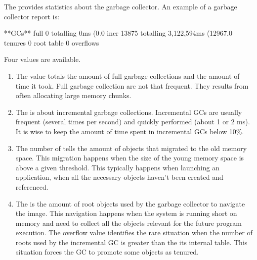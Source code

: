 \documentclass[a4paper,10pt,twoside]{book}
\begin{document}
The  provides statistics about the garbage collector. An example of a garbage collector report is:

\begin{code}

**GCs**
	full			0 totalling 0ms (0.0%
	incr		13875 totalling 3,122,594ms (12967.0%
	tenures		0
	root table	0 overflows
\end{code}

Four values are available.

\begin{enumerate}
\item The  value totals the amount of full garbage collections and the amount of time it took. Full garbage collection are not that frequent. They results from often allocating large memory chunks.

\item The  is about incremental garbage collections. Incremental GCs are usually frequent (several times per second) and quickly performed (about 1 or 2 ms). It is wise to keep the amount of time spent in incremental GCs below 10\%. 


\item The number of  tells the amount of objects that migrated to the old memory space. This migration happens when the size of the young memory space is above a given threshold. This typically happens when launching an application, when all the necessary objects haven't been created and referenced. 

\item The  is the amount of root objects used by the garbage collector to navigate the image. This navigation happens when the system is running short on memory and need to collect all the objects relevant for the future program execution. The overflow value identifies the rare situation when the number of roots used by the incremental GC is greater than the its internal table. This situation forces the GC to promote some objects as tenured.

\end{enumerate}
\end{document}
